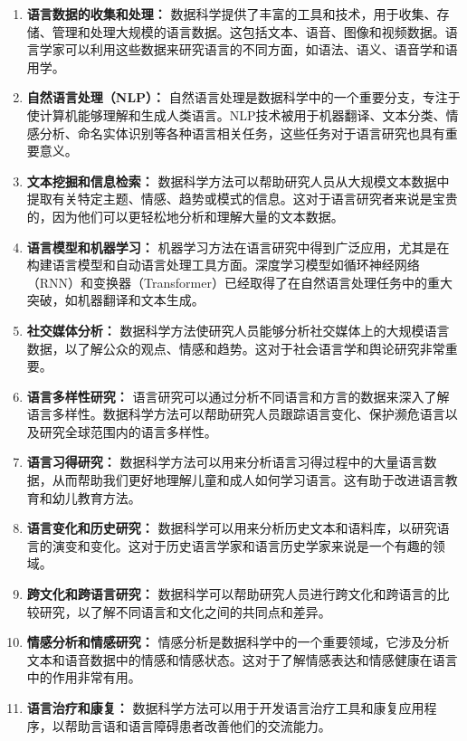 \documentclass[]{book}
\begin{document}
\begin{enumerate}
\def\labelenumi{\arabic{enumi}.}
\item
  \textbf{语言数据的收集和处理：} 数据科学提供了丰富的工具和技术，用于收集、存储、管理和处理大规模的语言数据。这包括文本、语音、图像和视频数据。语言学家可以利用这些数据来研究语言的不同方面，如语法、语义、语音学和语用学。
\item
  \textbf{自然语言处理（NLP）：} 自然语言处理是数据科学中的一个重要分支，专注于使计算机能够理解和生成人类语言。NLP技术被用于机器翻译、文本分类、情感分析、命名实体识别等各种语言相关任务，这些任务对于语言研究也具有重要意义。
\item
  \textbf{文本挖掘和信息检索：} 数据科学方法可以帮助研究人员从大规模文本数据中提取有关特定主题、情感、趋势或模式的信息。这对于语言研究者来说是宝贵的，因为他们可以更轻松地分析和理解大量的文本数据。
\item
  \textbf{语言模型和机器学习：} 机器学习方法在语言研究中得到广泛应用，尤其是在构建语言模型和自动语言处理工具方面。深度学习模型如循环神经网络（RNN）和变换器（Transformer）已经取得了在自然语言处理任务中的重大突破，如机器翻译和文本生成。
\item
  \textbf{社交媒体分析：} 数据科学方法使研究人员能够分析社交媒体上的大规模语言数据，以了解公众的观点、情感和趋势。这对于社会语言学和舆论研究非常重要。
\item
  \textbf{语言多样性研究：} 语言研究可以通过分析不同语言和方言的数据来深入了解语言多样性。数据科学方法可以帮助研究人员跟踪语言变化、保护濒危语言以及研究全球范围内的语言多样性。
\item
  \textbf{语言习得研究：} 数据科学方法可以用来分析语言习得过程中的大量语言数据，从而帮助我们更好地理解儿童和成人如何学习语言。这有助于改进语言教育和幼儿教育方法。
\item
  \textbf{语言变化和历史研究：} 数据科学可以用来分析历史文本和语料库，以研究语言的演变和变化。这对于历史语言学家和语言历史学家来说是一个有趣的领域。
\item
  \textbf{跨文化和跨语言研究：} 数据科学可以帮助研究人员进行跨文化和跨语言的比较研究，以了解不同语言和文化之间的共同点和差异。
\item
  \textbf{情感分析和情感研究：} 情感分析是数据科学中的一个重要领域，它涉及分析文本和语音数据中的情感和情感状态。这对于了解情感表达和情感健康在语言中的作用非常有用。
\item
  \textbf{语言治疗和康复：} 数据科学方法可以用于开发语言治疗工具和康复应用程序，以帮助言语和语言障碍患者改善他们的交流能力。
\end{enumerate}
\end{document}
